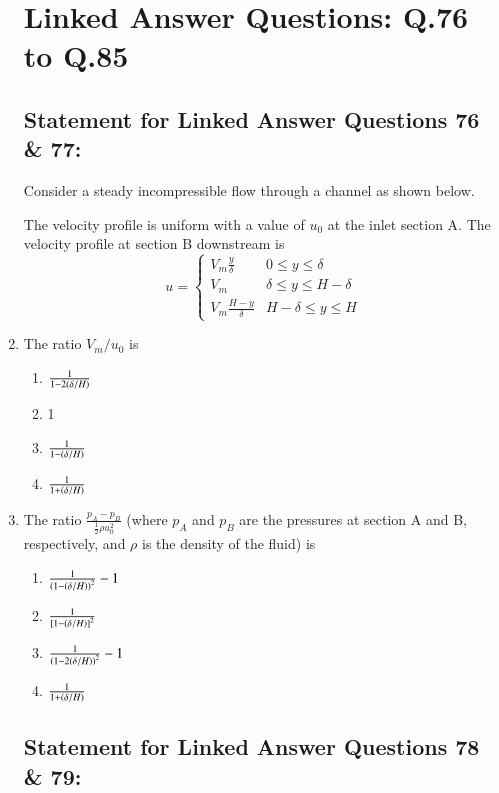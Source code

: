\documentclass[journal,12pt,onecolumn]{IEEEtran}
\theoremstyle{remark}
\begin{document}
\begin{enumerate}
\section{Linked Answer Questions: Q.76 to Q.85}

\subsection{Statement for Linked Answer Questions 76 \& 77:}

Consider a steady incompressible flow through a channel as shown below.
\begin{center}

\end{center}
The velocity profile is uniform with a value of $u_0$ at the inlet section A. The velocity profile at section B downstream is
\[
u = 
\begin{cases} 
      V_m \frac{y}{\delta} & 0 \leq y \leq \delta \\
      V_m & \delta \leq y \leq H - \delta \\
      V_m \frac{H - y}{\delta} & H - \delta \leq y \leq H 
   \end{cases}
\]

\item The ratio $V_m / u_0$ is

\begin{enumerate}
	\item $\frac{1}{1 - 2\left(\delta / H\right)}$
    \item 1
    \item $\frac{1}{1 - \left(\delta / H\right)}$
    \item $\frac{1}{1 + \left(\delta / H\right)}$
\end{enumerate}

\item The ratio $\frac{p_A - p_B}{\frac{1}{2} \rho u_0^2}$ (where $p_A$ and $p_B$ are the pressures at section A and B, respectively, and $\rho$ is the density of the fluid) is

\begin{enumerate}
	\item $\frac{1}{\left( 1 - \left(\delta / H\right)\right)^2} - 1$
	\item $\frac{1}{{}\left[ 1 - \left(\delta / H\right) \right]^2}$

	\item $\frac{1}{\left( 1 - 2\left(\delta / H\right)\right)^2} - 1$
	\item $\frac{1}{1 + \left(\delta / H\right)} $
\end{enumerate}
\subsection{Statement for Linked Answer Questions 78 \& 79:}


\end{enumerate}
\end{document}
